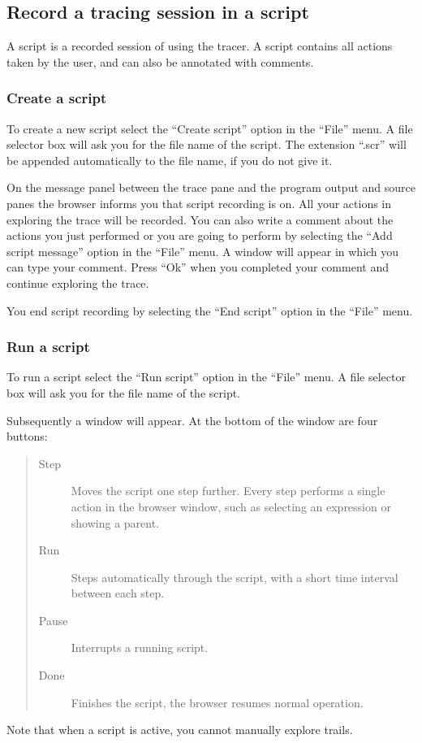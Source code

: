 \documentclass[12pt]{article}
\begin{document}
\subsection{Record a tracing session in a script}

A script is a recorded session of using the tracer. A script
contains all actions taken by the user, and can also be annotated
with comments. 

\subsubsection{Create a script}

To create a new script select the ``Create script'' option in the ``File'' menu. A file selector box will ask you for the file name of the script. The extension ``.scr'' will be appended automatically to the file name, if you do not give it.

On the message panel between the trace pane and the program output and source panes the browser informs you that script recording is on. All your actions in exploring the trace will be recorded. You can also write a comment about the actions you just performed or you are going to perform by selecting the ``Add script message'' option in the ``File'' menu. A window will appear in which you can type your comment. Press ``Ok'' when you completed your comment and continue exploring the trace.

You end script recording by selecting the ``End script'' option in the ``File'' menu.

\subsubsection{Run a script}

To run a script select the ``Run script'' option in the ``File'' menu.
A file selector box will ask you for the file name of the script. 

Subsequently a window will appear. At the bottom of the window are four buttons:
\begin{quote}
\begin{description}
\item[Step] Moves the script one step further. Every step performs a single action in the browser window, such as selecting an expression or showing a parent.
\item[Run] Steps automatically through the script, with a short time interval
between each step.
\item[Pause] Interrupts a running script.
\item[Done] Finishes the script, the browser resumes normal operation.
\end{description}
\end{quote}
Note that when a script is active, you cannot manually explore trails.
\end{document}
